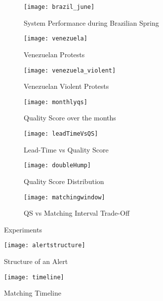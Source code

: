 \begin{figure*}
\centering
\begin{subfigure}{\columnwidth}
  \centering
  \texttt{[image: brazil\_june]}
  \caption{System Performance during Brazilian Spring}
  \label{fig:brazil_june}
\end{subfigure}%
\begin{subfigure}{\columnwidth}
  \centering
  \texttt{[image: venezuela]}
  \caption{Venezuelan Protests}
  \label{fig:venezuela_feb}
\end{subfigure}
\begin{subfigure}{\columnwidth}
  \centering
  \texttt{[image: venezuela\_violent]}
  \caption{Venezuelan Violent Protests}
  \label{fig:venezuela_violent}
\end{subfigure}%
\begin{subfigure}{\columnwidth}
  \centering
  \texttt{[image: monthlyqs]}
  \caption{Quality Score over the months}
  \label{fig:monthlyqs}
\end{subfigure}
\begin{subfigure}{\columnwidth}
  \centering
  \texttt{[image: leadTimeVsQS]}
  \caption{Lead-Time vs Quality Score}
  \label{fig:leadTimeVsQS}
\end{subfigure}%
\begin{subfigure}{\columnwidth}
  \centering
  \texttt{[image: doubleHump]}
  \caption{Quality Score Distribution}
  \label{fig:doubleHump}
\end{subfigure}
\begin{subfigure}{\columnwidth}
  \centering
  \texttt{[image: matchingwindow]}
  \caption{QS vs Matching Interval Trade-Off}
  \label{fig:matchinginterval}
\end{subfigure}%
\caption{Experiments}
\end{figure*}

\begin{figure}
    \texttt{[image: alertstructure]}
    \caption{Structure of an Alert}
    \label{fig:alertstructure}
\end{figure}
\begin{figure}
    \texttt{[image: timeline]}
    \caption{Matching Timeline}
    \label{fig:timeline}
\end{figure}
